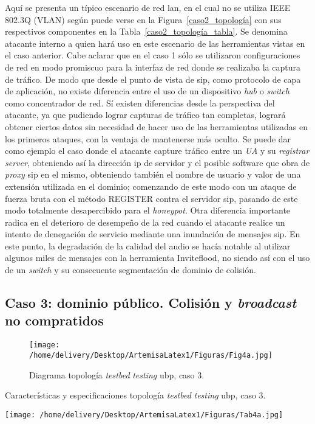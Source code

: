 \documentclass[a4paper,12pt]{report}
\begin{document}
Aquí se presenta un típico escenario de red \ac{lan}, en el cual no se utiliza IEEE 
802.3Q (VLAN) según puede verse en la Figura~\ref{caso2_topología} con sus respectivos componentes
en la Tabla~\ref{caso2_topología_tabla}. 
Se denomina atacante interno a quien hará uso en este escenario
de las herramientas vistas en el caso anterior.
Cabe aclarar que en el caso 1 sólo se utilizaron configuraciones de red en 
modo promiscuo para la interfaz de red donde se realizaba la captura de tráfico.
De modo que desde el punto de vista de \ac{sip}, como protocolo de capa de
aplicación, no existe diferencia entre el uso de un dispositivo \emph{hub} o \emph{switch}
como concentrador de red. 
Sí existen diferencias desde la perspectiva del atacante, ya que pudiendo lograr
 capturas de tráfico tan completas, logrará obtener ciertos datos sin necesidad
de hacer uso de las herramientas utilizadas en los primeros ataques, con la
ventaja de mantenerse más oculto. Se puede dar como ejemplo el caso donde el
atacante capture tráfico entre un \emph{UA} y su \emph{registrar server},
obteniendo así la dirección \ac{ip} de servidor y el posible software que obra de
\emph{proxy} \ac{sip} en el mismo, obteniendo también el nombre de usuario y valor de
una extensión utilizada en el dominio; comenzando de este modo con un ataque de
fuerza bruta con el método REGISTER contra el servidor \ac{sip}, pasando de este modo
totalmente desapercibido para el \emph{honeypot}.
Otra diferencia importante radica en el deterioro de desempeño de la red cuando
 el atacante realice un intento de denegación de servicio mediante una
inundación de mensajes \ac{sip}. En este punto, la degradación de la calidad del audio
se hacía notable al utilizar algunos miles de mensajes con la herramienta
Inviteflood, no siendo así con el uso de un \emph{switch} y su consecuente segmentación
de dominio de colisión.    


\subsection{Caso 3: dominio público. Colisión y \emph{broadcast} no compratidos}

\begin{figure}[h!] 
\centering
\texttt{[image: /home/delivery/Desktop/ArtemisaLatex1/Figuras/Fig4a.jpg]}
\caption{Diagrama topología \emph{testbed} \emph{testing} \ac{ubp}, caso 3.}
\label{caso3_topología}
\end{figure}

\begin{table}[h!]
\caption{Características y especificaciones topología \emph{testbed} \emph{testing} \ac{ubp}, caso 3.}
\centering
\texttt{[image: /home/delivery/Desktop/ArtemisaLatex1/Figuras/Tab4a.jpg]}
\label{caso3_topología_tabla}
\end{table}
\end{document}
